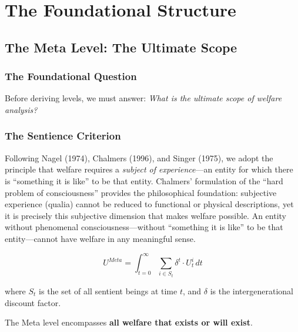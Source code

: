 \documentclass[12pt,a4paper]{article}
\begin{document}
\section{The Foundational Structure}
\label{sec:foundation}

\subsection{The Meta Level: The Ultimate Scope}

\subsubsection{The Foundational Question}

Before deriving levels, we must answer: \textit{What is the ultimate scope of 
welfare analysis?}

\subsubsection{The Sentience Criterion}

Following Nagel (1974), Chalmers (1996), and Singer (1975), we 
adopt the principle that welfare requires a \textit{subject of experience}---an 
entity for which there is ``something it is like'' to be that entity. Chalmers' 
formulation of the ``hard problem of consciousness'' provides the philosophical 
foundation: subjective experience (qualia) cannot be reduced to functional or 
physical descriptions, yet it is precisely this subjective dimension that makes 
welfare possible. An entity without phenomenal consciousness---without 
``something it is like'' to be that entity---cannot have welfare in any 
meaningful sense.

\begin{tcolorbox}[colback=green!5!white, colframe=green!50!black, title=Definition: The Meta Level]
\begin{equation}
\boxed{
U^{Meta} = \int_{t=0}^{\infty} \sum_{i \in S_t} \delta^t \cdot U^i_t \, dt
}
\label{eq:meta-level}
\end{equation}

where $S_t$ is the set of all sentient beings at time $t$, and $\delta$ is the 
intergenerational discount factor.

The Meta level encompasses \textbf{all welfare that exists or will exist}.
\end{tcolorbox}
\end{document}
